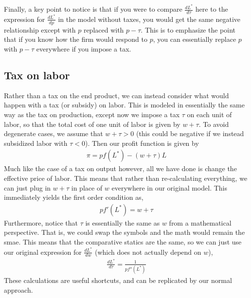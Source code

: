 Finally, a key point to notice is that if you were to compare $\frac{dL^*}{d\tau}$ here to the expression for $\frac{dL^*}{dp}$ in the model without taxes, you would get the same negative relationship except with $p$ replaced with $p - \tau$. This is to emphasize the point that if you know how the firm would respond to $p$, you can essentially replace $p$ with $p - \tau$ everywhere if you impose a tax. 

\subsection*{Tax on labor}
Rather than a tax on the end product, we can instead consider what would happen with a tax (or subsidy) on labor. This is modeled in essentially the same way as the tax on production, except now we impose a tax $\tau$ on each unit of labor, so that the total cost of one unit of labor is given by $w + \tau$. To avoid degenerate cases, we assume that $w + \tau > 0$ (this could be negative if we instead subsidized labor with $\tau < 0$). Then our profit function is given by
\begin{align*}
    \pi = p f(L^*) - (w + \tau) L
\end{align*}
Much like the case of a tax on output however, all we have done is change the effective price of labor. This means that rather than re-calculating everything, we can just plug in $w + \tau$ in place of $w$ everywhere in our original model. This immediately yields the first order condition as,
\begin{align*}
    p f'(L^*) = w + \tau
\end{align*}
Furthermore, notice that $\tau$ is essentially the same as $w$ from a mathematical perspective. That is, we could swap the symbols and the math would remain the smae. This means that the comparative statics are the same, so we can just use our original expression for $\frac{dL^*}{dw}$ (which does not actually depend on $w$),
\begin{align*}
    \frac{dL^*}{d\tau}= \frac{1}{pf''(L^*)}
\end{align*}
These calculations are useful shortcuts, and can be replicated by our normal approach. 

